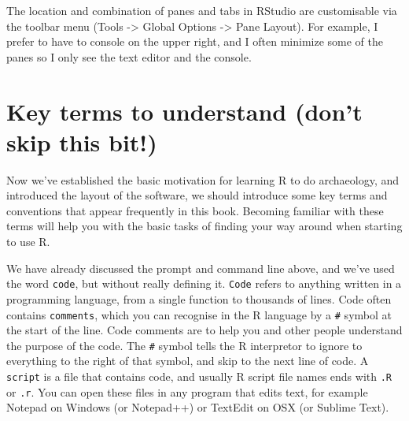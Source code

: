 \documentclass[]{book}
\begin{document}
The location and combination of panes and tabs in RStudio are
customisable via the toolbar menu (Tools -\textgreater{} Global Options
-\textgreater{} Pane Layout). For example, I prefer to have to console
on the upper right, and I often minimize some of the panes so I only see
the text editor and the console.

\section{Key terms to understand (don't skip this
bit!)}\label{key-terms-to-understand-dont-skip-this-bit}

Now we've established the basic motivation for learning R to do
archaeology, and introduced the layout of the software, we should
introduce some key terms and conventions that appear frequently in this
book. Becoming familiar with these terms will help you with the basic
tasks of finding your way around when starting to use R.

We have already discussed the prompt and command line above, and we've
used the word \texttt{code}, but without really defining it.
\texttt{Code} refers to anything written in a programming language, from
a single function to thousands of lines. Code often contains
\texttt{comments}, which you can recognise in the R language by a
\texttt{\#} symbol at the start of the line. Code comments are to help
you and other people understand the purpose of the code. The \texttt{\#}
symbol tells the R interpretor to ignore to everything to the right of
that symbol, and skip to the next line of code. A \texttt{script} is a
file that contains code, and usually R script file names ends with
\texttt{.R} or \texttt{.r}. You can open these files in any program that
edits text, for example Notepad on Windows (or Notepad++) or TextEdit on
OSX (or Sublime Text).
\end{document}
